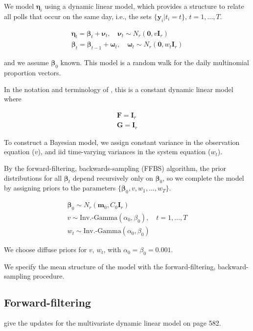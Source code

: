 \documentclass{article}
\begin{document}
We model $\bm\eta_{i}$ using a dynamic linear model, which provides a
structure to relate all polls that occur on the same day, i.e., the
sets $\{\mathbf{y}_{i} | t_{i}=t \}$, $t=1,\dots,T$.

\begin{gather}
  \bm\eta_{t} = \bm\beta_{t} + \bm\nu_{t},\quad \bm\nu_{t}\sim N_{r}(\bm 0,
  v\mathbf{I}_{r}) \\
  \bm\beta_{t} = \bm\beta_{t-1} + \bm\omega_{t}, \quad
  \bm\omega_{t}\sim N_{r}(\bm 0, w_{t}\mathbf{I}_{r})
\end{gather}

and we assume
$\bm\beta_{0}$ known. This model is a random walk for the daily
multinomial proportion vectors.

In the notation and terminology of \cite{west1997}, this is a constant
dynamic linear model where

\begin{gather}
  \mathbf{F} = \mathbf{I}_{r} \\
  \mathbf{G} = \mathbf{I}_{r}
\end{gather}

To construct a Bayesian model, we assign
constant variance in the observation equation ($v$), and 
iid time-varying variances in the system equation
($w_{t}$).

By the forward-filtering, backwards-sampling (FFBS) algorithm, the
prior distributions for all $\bm\beta_{t}$ depend recursively only on
$\bm\beta_{0}$, so we complete the model by assigning priors to the
parameters $\{ \bm\beta_{0}, v, w_{1},\dots, w_{T}\}$.

\begin{gather}
  \bm\beta_{0}\sim N_{r}(\mathbf{m}_{0}, C_{0}\mathbf{I}_{r}) \\
  v\sim \text{Inv.-Gamma}(\alpha_{0},\beta_{0}), \quad t=1,\dots,T \\
  w_{t} \sim \text{Inv.-Gamma}(\alpha_{0},\beta_{0})
\end{gather}

We choose diffuse priors for $v$, $w_{t}$, with
$\alpha_{0}=\beta_{0}=0.001$.

We specify the mean structure of the model with the forward-filtering,
backward-sampling procedure.

\subsection{Forward-filtering}

\cite{west1997} give the updates for the multivariate dynamic
linear model on page 582.
\end{document}
